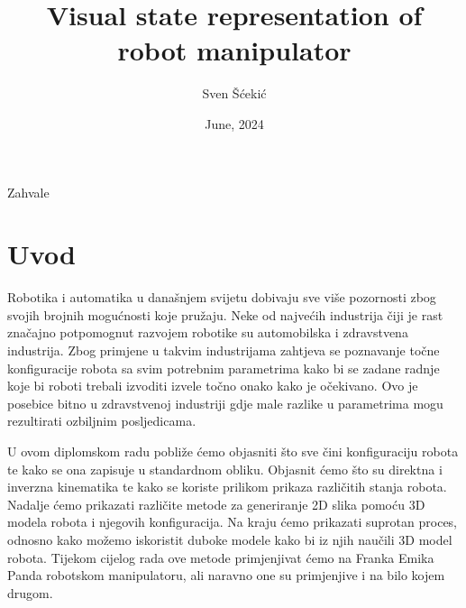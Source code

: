 \documentclass[times, utf8, diplomskirad]{fer}
\title{Visual state representation of robot manipulator}
\author{Sven Šćekić}
\date{June, 2024}
\begin{document}
\maketitle






\begin{zahvale}
    Zahvale
\end{zahvale}


\mainmatter
{}


\tableofcontents

\setcounter{page}{1}
\mainmatter

\chapter{Uvod}
\label{pog:uvod}
\hspace{\parindent}Robotika i automatika u današnjem svijetu dobivaju sve više pozornosti zbog svojih brojnih mogućnosti koje pružaju.
Neke od najvećih industrija čiji je rast značajno potpomognut razvojem robotike su automobilska i zdravstvena industrija.
Zbog primjene u takvim industrijama zahtjeva se poznavanje točne konfiguracije robota sa svim potrebnim parametrima kako
bi se zadane radnje koje bi roboti trebali izvoditi izvele točno onako kako je očekivano.
Ovo je posebice bitno u zdravstvenoj industriji gdje male razlike u parametrima mogu rezultirati ozbiljnim posljedicama.

U ovom diplomskom radu pobliže ćemo objasniti što sve čini konfiguraciju robota te kako se ona zapisuje u standardnom obliku.
Objasnit ćemo što su direktna i inverzna kinematika te kako se koriste prilikom prikaza različitih stanja robota.
Nadalje ćemo prikazati različite metode za generiranje 2D slika pomoću 3D modela robota i njegovih konfiguracija.
Na kraju ćemo prikazati suprotan proces, odnosno kako možemo iskoristit duboke modele kako bi iz njih naučili 3D model robota.
Tijekom cijelog rada ove metode primjenjivat ćemo na Franka Emika Panda robotskom manipulatoru, ali naravno one su primjenjive i na bilo kojem drugom.
\end{document}
